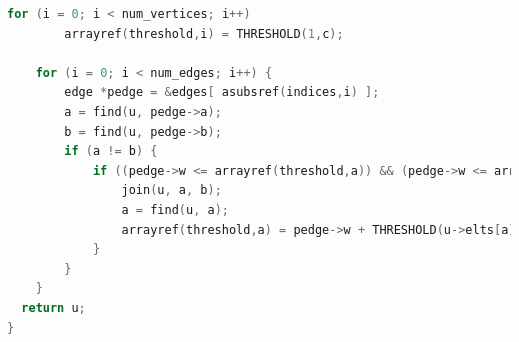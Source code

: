 \begin{appendices}
\begin{lstlisting}[language=C,basicstyle=\small]
    for (i = 0; i < num_vertices; i++)
        arrayref(threshold,i) = THRESHOLD(1,c);

    for (i = 0; i < num_edges; i++) {
        edge *pedge = &edges[ asubsref(indices,i) ];
		a = find(u, pedge->a);
        b = find(u, pedge->b);
        if (a != b) {
            if ((pedge->w <= arrayref(threshold,a)) && (pedge->w <= arrayref(threshold,b))) {
	            join(u, a, b);
	            a = find(u, a);
	            arrayref(threshold,a) = pedge->w + THRESHOLD(u->elts[a].size, c);
            }
        }
    }
  return u;
}
\end{lstlisting}
\label{lsting:multi}
\end{appendices}